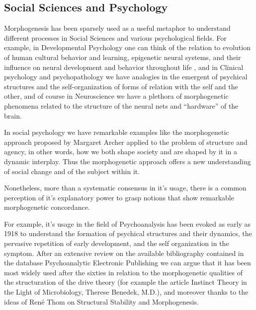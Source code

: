 \documentclass[fleqn,10pt]{wlscirep}
\begin{document}
\subsection*{Social Sciences and Psychology}

Morphogenesis has been sparsely used as a useful metaphor to understand different processes in Social Sciences and various psychological fields. For example, in Developmental Psychology one can think of the relation to evolution of human cultural behavior and learning, epigenetic neural systems, and their influence on neural development and behavior throughout life , and in Clinical psychology and psychopathology we have analogies in the emergent of psychical structures and the self-organization of forms of relation with the self and the other, and of course in Neuroscience we have a plethora of morphogenetic phenomena related to  the structure of the neural nets and “hardware” of the brain.

In social psychology we have remarkable examples like the morphogenetic approach proposed by Margaret Archer applied to the problem of structure and agency, in other words, how we both shape society and are shaped by it in a dynamic interplay. Thus the morphogenetic approach offers a new understanding of social change and of the subject within it.  

Nonetheless, more than a systematic consensus in it’s usage, there is a common perception of it’s explanatory power to grasp notions that show remarkable morphogenetic concordance.

For example, it’s usage in the field of Psychoanalysis has been evoked as early as 1918 to understand the formation of psychical structures and their dynamics, the pervasive repetition of early development, and the self organization in the symptom. After an extensive review on the available bibliography contained in the database Psychoanalytic Electronic Publishing we can argue that it has been most widely used after the sixties in relation to the morphogenetic qualities of the structuration of the drive theory (for example the article Instinct Theory in the Light of Microbiology, Therese Benedek, M.D.), and moreover thanks to the ideas of René Thom on Structural Stability and Morphogenesis.





\cite{straus1977societal}
\end{document}
